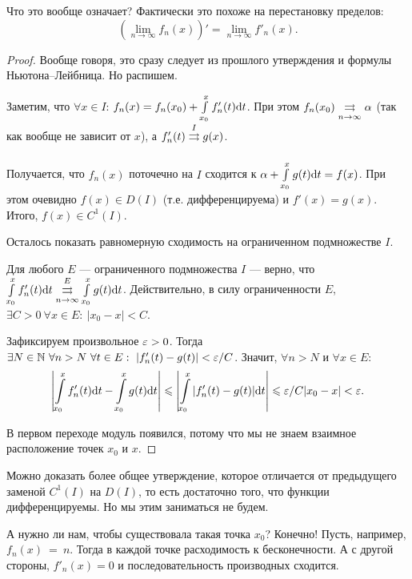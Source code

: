 \documentclass[a4paper, 12pt]{article}
\begin{document}
Что это вообще означает? Фактически это похоже на перестановку пределов:
$$
(\lim\limits_{n \to \infty} f_n(x))' = \lim\limits_{n \to \infty} f'_n(x). 
$$

\begin{proof}
Вообще говоря, это сразу следует из прошлого утверждения и формулы Ньютона--Лейбница. Но распишем.

Заметим, что $\forall x \in I$: $f_n(x) = f_n(x_0) + \int\limits_{x_0}^x f'_n(t) \mathrm{d} t$. При этом $f_n(x_0) \overset{}{\underset{n \to \infty}{\rightrightarrows}} \alpha$ (так как вообще не зависит от $x$), а $f'_n(t) \overset{I}{\underset{}{\rightrightarrows}} g(x)$.

Получается, что $f_n(x)$ поточечно на $I$ сходится к $\alpha + \int\limits_{x_0}^x g(t)\mathrm{d} t = f(x)$. При этом очевидно $f(x) \in D(I)$ (т.е. дифференцируема) и $f'(x) = g(x)$. Итого, $f(x) \in C^1(I)$.

Осталось показать равномерную сходимость на ограниченном подмножестве $I$.

Для любого $E$ --- ограниченного подмножества $I$ --- верно, что $\int\limits_{x_0}^xf'_n(t) \mathrm{d} t \overset{E}{\underset{n \to \infty}{\rightrightarrows}} \int\limits_{x_0}^x g(t) \mathrm{d} t$. Действительно, в силу ограниченности $E$, $\exists C > 0\ \forall x \in E: \ |x_0 - x| < C$.

Зафиксируем произвольное $\varepsilon > 0$. Тогда $\exists N \in \mathbb{N}\ \forall n > N\ \forall t \in E:\ |f'_n(t) - g(t)| < \varepsilon/C$. Значит, $\forall n > N$ и $\forall x \in E$:
\begin{gather}
\left| \int\limits_{x_0}^x f'_n(t) \mathrm{d} t - \int\limits_{x_0}^x g(t) \mathrm{d} t \right| \leqslant \left| \int\limits_{x_0}^x |f'_n(t) - g(t)| \mathrm{d} t \right| \leqslant \varepsilon/C |x_0 - x| < \varepsilon.
\end{gather}

В первом переходе модуль появился, потому что мы не знаем взаимное расположение точек $x_0$ и $x$.
\end{proof}

Можно доказать более общее утверждение, которое отличается от предыдущего заменой $C^1(I)$ на $D(I)$, то есть достаточно того, что функции дифференцируемы. Но мы этим заниматься не будем.

А нужно ли нам, чтобы существовала такая точка $x_0$? Конечно! Пусть, например, $f_n(x)~=~n$. Тогда в каждой точке расходимость к бесконечности. А с другой стороны, $f'_n(x) = 0$ и последовательность производных сходится.
\end{document}
